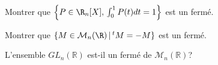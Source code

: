\documentclass[a4paper,twoside,french,11pt]{VcCours}
\begin{document}

\begin{Exercice}{} Montrer que $\left\{P\in\R_n[X], \, \int_0^1P(t)dt= 1\right\}$ est un fermé.
\end{Exercice}


\begin{Exercice}{} Montrer que $\{M\in{\cal M}_n(\R) \, \vert \,  ^tM=-M\}$ est un fermé.
\end{Exercice}


\begin{Exercice}{} L'ensemble $GL_n(\mathbb{R})$ est-il un fermé de $\mathcal{M}_n(\mathbb{R})$?
\end{Exercice} 

\end{document}
